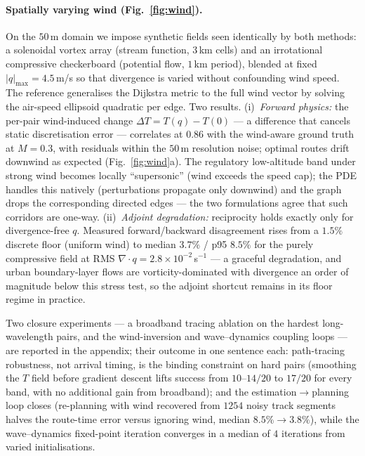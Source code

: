 \paragraph{Spatially varying wind (Fig.~\ref{fig:wind}).}
On the $50\,$m domain we impose synthetic fields seen identically by
both methods: a solenoidal vortex array (stream function,
$3\,$km cells) and an irrotational compressive checkerboard
(potential flow, $1\,$km period), blended at fixed
$|q|_{\max} = 4.5\,$m/s so that divergence is varied without
confounding wind speed. The reference generalises the Dijkstra
metric to the full wind vector by solving the air-speed ellipsoid
quadratic per edge. Two results. (i)~\emph{Forward physics:} the
per-pair wind-induced change $\Delta T = T(q) - T(0)$ --- a
difference that cancels static discretisation error --- correlates
at $0.86$ with the wind-aware ground truth at $M = 0.3$, with
residuals within the $50\,$m resolution noise; optimal routes drift
downwind as expected (Fig.~\ref{fig:wind}a). The regulatory
low-altitude band under strong wind becomes locally ``supersonic''
(wind exceeds the speed cap); the PDE handles this natively
(perturbations propagate only downwind) and the graph drops the
corresponding directed edges --- the two formulations agree that
such corridors are one-way. (ii)~\emph{Adjoint degradation:}
reciprocity holds exactly only for divergence-free $q$. Measured
forward/backward disagreement rises from a $1.5\%$ discrete floor
(uniform wind) to median $3.7\%$ / p95 $8.5\%$ for the purely
compressive field at RMS $\nabla\!\cdot q = 2.8\times10^{-2}\,$s$^{-1}$
--- a graceful degradation, and urban boundary-layer flows are
vorticity-dominated with divergence an order of magnitude below this
stress test, so the adjoint shortcut remains in its floor regime in
practice.

Two closure experiments --- a broadband tracing ablation on the
hardest long-wavelength pairs, and the wind-inversion and
wave--dynamics coupling loops --- are reported in the appendix; their
outcome in one sentence each: path-tracing robustness, not arrival
timing, is the binding constraint on hard pairs (smoothing the $T$
field before gradient descent lifts success from $10$--$14/20$ to
$17/20$ for every band, with no additional gain from broadband); and
the estimation$\to$planning loop closes (re-planning with wind
recovered from $1254$ noisy track segments halves the
route-time error versus ignoring wind, median $8.5\% \to 3.8\%$),
while the wave--dynamics fixed-point iteration converges in a median
of $4$ iterations from varied initialisations.

